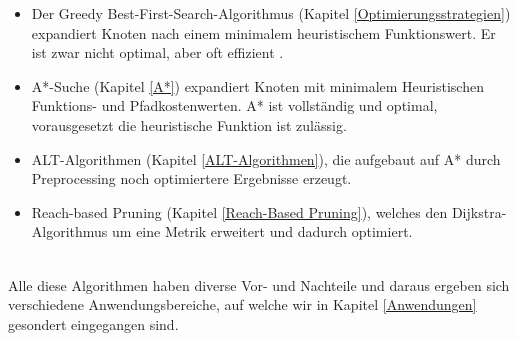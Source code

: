 \begin{itemize}
\begin{itemize}
        \item Der Greedy Best-First-Search-Algorithmus (Kapitel \ref{Optimierungsstrategien}) expandiert Knoten nach einem minimalem heuristischem Funktionswert. Er ist zwar nicht optimal, aber oft effizient \cite[108,109]{Russell:10}.
        \item A*-Suche (Kapitel \ref{A*}) expandiert Knoten mit minimalem Heuristischen Funktions- und Pfadkostenwerten. A* ist vollständig und optimal, vorausgesetzt die heuristische Funktion ist zulässig.
        \item ALT-Algorithmen (Kapitel \ref{ALT-Algorithmen}), die aufgebaut auf A* durch Preprocessing noch optimiertere Ergebnisse erzeugt.
        \item Reach-based Pruning (Kapitel \ref{Reach-Based Pruning}), welches den Dijkstra-Algorithmus um eine Metrik erweitert und dadurch optimiert.
    \end{itemize}
\end{itemize}
\noindent \\
Alle diese Algorithmen haben diverse Vor- und Nachteile und daraus ergeben sich verschiedene 
Anwendungsbereiche, auf welche wir in Kapitel \ref{Anwendungen} gesondert eingegangen sind.
